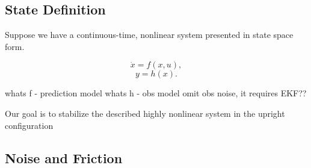 \documentclass[journal]{IEEEtran}
\begin{document}





\subsection{State Definition}
Suppose we have a continuous-time, nonlinear system presented in state space
form.

\begin{equation}
    \dot{x} = f(x,u),
\end{equation}
\begin{equation}
    y = h(x).
\end{equation}

whats f - prediction model
whats h - obs model
omit obs noise, it requires EKF??

Our goal is to stabilize the described highly nonlinear system in the upright
configuration

\subsection{Noise and Friction}
\end{document}
